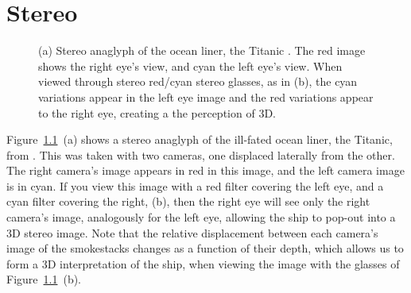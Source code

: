 \chapter{Stereo}


\begin{figure}[t!]
\centerline{
}
\caption{(a) Stereo anaglyph of the ocean liner, the Titanic \cite{McManus2022}.  The red image shows the right eye's view, and cyan the left eye's view.  When viewed through stereo red/cyan stereo glasses, as in (b), the cyan variations appear in the left eye image and the red variations appear to the right eye, creating a the perception of 3D.}
\label{fig:titanic}
\end{figure}

Figure~\ref{fig:titanic}~(a) shows a stereo anaglyph of the ill-fated ocean liner, the Titanic, from \cite{McManus2022}.  This was taken with two cameras, one displaced laterally from the other.  The right camera's image appears in red in this image, and the left camera image is in cyan.  If you view this image with a red filter covering the left eye, and a cyan filter covering the right, (b), then the right eye will see only the right camera's image, analogously for the left eye, allowing the ship to pop-out into a 3D stereo image.  Note that the relative displacement between each camera's image of the smokestacks changes as a function of their depth, which allows us to form a 3D interpretation of the ship, when viewing the image with the glasses of Figure~\ref{fig:titanic}~(b).


